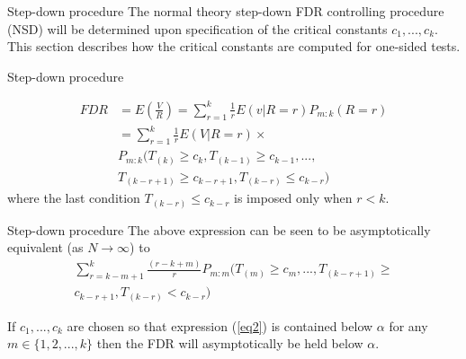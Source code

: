 \documentclass{beamer}
\begin{document}
\begin{frame}[t]{Step-down procedure}\vspace{10pt}
The normal theory step-down FDR controlling procedure (NSD) will be determined upon specification of the critical constants $c_1,...,c_k$. This section describes how the critical constants
are computed for one-sided tests.

\end{frame}

\begin{frame}[t]{Step-down procedure}\vspace{10pt}

\begin{equation} \label{eq1}
\begin{split}
FDR &= E\left(\frac{V}{R}\right) 
    = \sum_{r=1}^{k}\frac{1}{r}E(v|R=r)P_{m:k}(R=r) \\
    &= \sum_{r=1}^{k} \frac{1}{r}E(V|R=r) \times \\
    & P_{m:k}(T_{(k)} \geq c_k, T_{(k-1)} \geq c_{k-1},..., \\
    &T_{(k-r+1)} \geq c_{k-r+1}, T_{(k-r)} \le c_{k-r})
 \end{split}   
    \end{equation}
where the last condition $T_{(k-r)} \le c_{k-r}$ is imposed only when $r<k$.
\end{frame}

\begin{frame}[t]{Step-down procedure}\vspace{10pt}
The above expression can be seen to be asymptotically equivalent (as $N \rightarrow \infty$) to \\
\begin{multline}\label{eq2}
\sum_{r=k-m+1}^{k} \frac{(r-k+m)}{r}P_{m:m}(T_{(m)} \geq c_m,...,T_{(k-r+1)} \geq\\ 
c_{k-r+1}, T_{(k-r)} < c_{k-r}) 
\end{multline}

If $c_1,...,c_k$ are chosen so that expression (\ref{eq2}) is contained below $\alpha$ for any $m \in \{1,2,...,k\}$ then the FDR will asymptotically be held below $\alpha$.
\end{frame}
\end{document}
